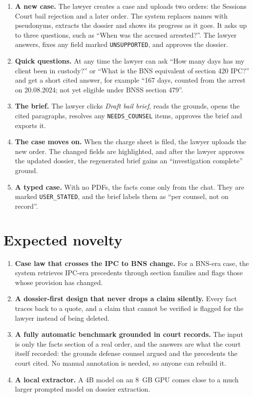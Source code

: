 \documentclass[11pt,a4paper]{article}
\newcommand{\st}[1]{\texttt{\small #1}}
\begin{document}
\begin{enumerate}
\item \textbf{A new case.} The lawyer creates a case and uploads two orders: the Sessions Court bail rejection and a later order. The system replaces names with pseudonyms, extracts the dossier and shows its progress as it goes. It asks up to three questions, such as ``When was the accused arrested?''. The lawyer answers, fixes any field marked \st{UNSUPPORTED}, and approves the dossier.
\item \textbf{Quick questions.} At any time the lawyer can ask ``How many days has my client been in custody?'' or ``What is the BNS equivalent of section 420 IPC?'' and get a short cited answer, for example ``167 days, counted from the arrest on 20.08.2024; not yet eligible under BNSS section 479''.
\item \textbf{The brief.} The lawyer clicks \emph{Draft bail brief}, reads the grounds, opens the cited paragraphs, resolves any \st{NEEDS\_COUNSEL} items, approves the brief and exports it.
\item \textbf{The case moves on.} When the charge sheet is filed, the lawyer uploads the new order. The changed fields are highlighted, and after the lawyer approves the updated dossier, the regenerated brief gains an ``investigation complete'' ground.
\item \textbf{A typed case.} With no PDFs, the facts come only from the chat. They are marked \st{USER\_STATED}, and the brief labels them as ``per counsel, not on record''.
\end{enumerate}

\section{Expected novelty}

\begin{enumerate}
\item \textbf{Case law that crosses the IPC to BNS change.} For a BNS-era case, the system retrieves IPC-era precedents through section families and flags those whose provision has changed.
\item \textbf{A dossier-first design that never drops a claim silently.} Every fact traces back to a quote, and a claim that cannot be verified is flagged for the lawyer instead of being deleted.
\item \textbf{A fully automatic benchmark grounded in court records.} The input is only the facts section of a real order, and the answers are what the court itself recorded: the grounds defense counsel argued and the precedents the court cited. No manual annotation is needed, so anyone can rebuild it.
\item \textbf{A local extractor.} A 4B model on an 8~GB GPU comes close to a much larger prompted model on dossier extraction.
\end{enumerate}
\end{document}
